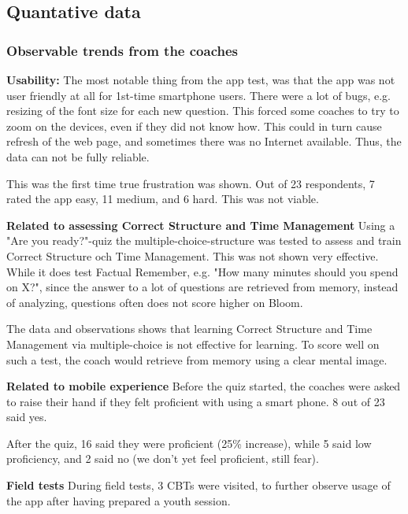 \subsection{Quantative data}


    \subsubsection{Observable trends from the coaches}

     \textbf{Usability: } The most notable thing from the app test, was that the app was not user friendly at all for 1st-time smartphone users. There were a lot of bugs, e.g. resizing of the font size for each new question. This forced some coaches to try to zoom on the devices, even if they did not know how. This could in turn cause refresh of the web page, and sometimes there was no Internet available. Thus, the data can not be fully reliable.

  This was the first time true frustration was shown. Out of 23 respondents, 7 rated the app easy, 11 medium, and 6 hard. This was not viable.

    \textbf{Related to assessing Correct Structure and Time Management}
    Using a "Are you ready?"-quiz the multiple-choice-structure was tested to assess and train Correct Structure och Time Management. This was not shown very effective. While it does test Factual Remember, e.g. "How many minutes should you spend on X?", since the answer to a lot of questions are retrieved from memory, instead of analyzing, questions often does not score higher on Bloom.

    The data and observations shows that learning Correct Structure and Time Management via multiple-choice is not effective for learning. To score well on such a test, the coach would retrieve from memory using a clear mental image.

    \textbf{Related to mobile experience}
    Before the quiz started, the coaches were asked to raise their hand if they felt proficient with using a smart phone. 8 out of 23 said yes.

    After the quiz, 16 said they were proficient (25\% increase), while 5 said low proficiency, and 2 said no (we don't yet feel proficient, still fear).

    \textbf{Field tests}
    During field tests, 3 CBTs were visited, to further observe usage of the app after having prepared a youth session.


